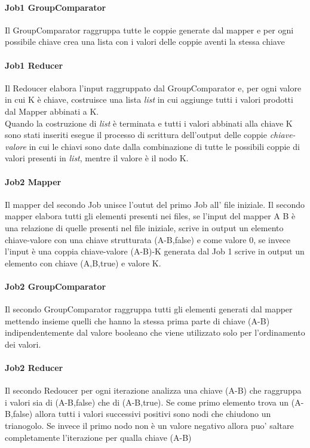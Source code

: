 \documentclass[paper=a4, fontsize=11pt]{scrartcl}	%
\numberwithin{equation}{section}															%
\numberwithin{figure}{section}																%
\numberwithin{table}{section}																%
\begin{document}
\paragraph{Job1 GroupComparator}
Il GroupComparator raggruppa tutte le coppie generate dal mapper e per ogni possibile chiave crea una lista con i valori delle coppie aventi la stessa chiave
\paragraph{Job1 Reducer}

Il Redoucer elabora l'input raggruppato dal GroupComparator e, per ogni valore in cui K è chiave, costruisce una lista \textit{list} in cui aggiunge tutti i valori prodotti dal Mapper abbinati a K.\\
Quando la costruzione di \textit{list} è terminata e tutti i valori abbinati alla chiave K sono stati inseriti esegue il processo di scrittura dell'output delle coppie \textit{chiave-valore} in cui le chiavi sono date dalla combinazione di tutte le possibili coppie di valori presenti in \textit{list}, mentre il valore è il nodo K.

\paragraph{Job2 Mapper}
Il mapper del secondo Job unisce l'outut del primo Job all' file iniziale. Il secondo mapper elabora tutti gli elementi presenti nei files, se l'input del mapper A B è una relazione di quelle presenti nel file iniziale, scrive in output un elemento chiave-valore con una chiave strutturata (A-B,false) e come valore 0, se invece l'input è una coppia chiave-valore (A-B)-K generata dal Job 1 scrive in output un elemento con chiave (A,B,true) e valore K.
\paragraph{Job2 GroupComparator}
Il secondo GroupComparator raggruppa tutti gli elementi generati dal mapper mettendo insieme quelli che hanno la stessa prima parte di chiave (A-B) indipendentemente dal valore booleano che viene utilizzato solo per l'ordinamento dei valori.

\paragraph{Job2 Reducer}
Il secondo Redoucer per ogni iterazione analizza una chiave (A-B) che raggruppa i valori sia di (A-B,false) che di (A-B,true). Se come primo elemento trova un (A-B,false) allora tutti i valori successivi positivi sono nodi che chiudono un trianogolo. Se invece il primo nodo non è un valore negativo allora puo' saltare completamente l'iterazione per qualla chiave (A-B)
\end{document}
